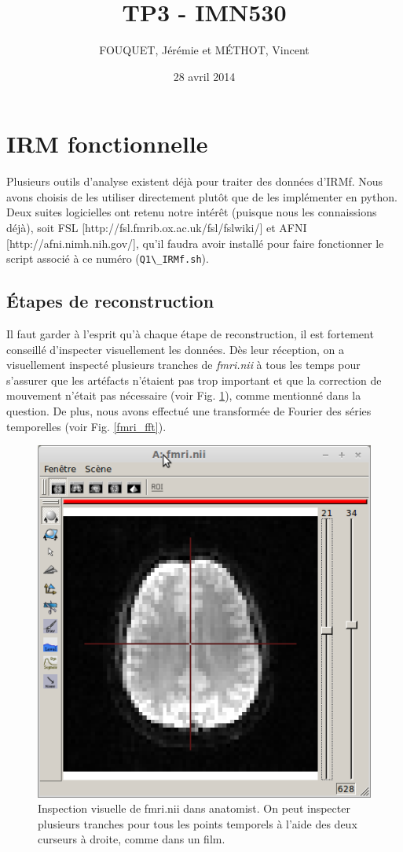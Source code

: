 \documentclass[a4paper]{article}
\title{TP3 - IMN530}
\author{FOUQUET, Jérémie et MÉTHOT, Vincent}
\date{28 avril 2014}
\begin{document}
\maketitle

\section{IRM fonctionnelle}

Plusieurs outils d'analyse existent déjà pour traiter des données d'IRMf. Nous avons choisis de les utiliser directement plutôt que de les implémenter en python. Deux suites logicielles ont retenu notre intérêt (puisque nous les connaissions déjà), soit FSL [http://fsl.fmrib.ox.ac.uk/fsl/fslwiki/] et AFNI [http://afni.nimh.nih.gov/], qu'il faudra avoir installé pour faire fonctionner le script associé à ce numéro (\lstinline{Q1\_IRMf.sh}).

\subsection{Étapes de reconstruction}

Il faut garder à l'esprit qu'à chaque étape de reconstruction, il est fortement conseillé d'inspecter visuellement les données. Dès leur réception, on a visuellement inspecté plusieurs tranches de \emph{fmri.nii} à tous les temps pour s'assurer que les artéfacts n'étaient pas trop important et que la correction de mouvement n'était pas nécessaire (voir Fig. \ref{fmri_anatomist}), comme mentionné dans la question. De plus, nous avons effectué une transformée de Fourier des séries temporelles (voir Fig. \ref{fmri_fft}).

\begin{figure}
   \centering
   \includegraphics[width=.7\textwidth]{fmri_anatomist}
   \caption{\label{fmri_anatomist} Inspection visuelle de fmri.nii dans anatomist. On peut inspecter plusieurs tranches pour tous les points temporels à l'aide des deux curseurs à droite, comme dans un film.}
\end{figure}
\end{document}
